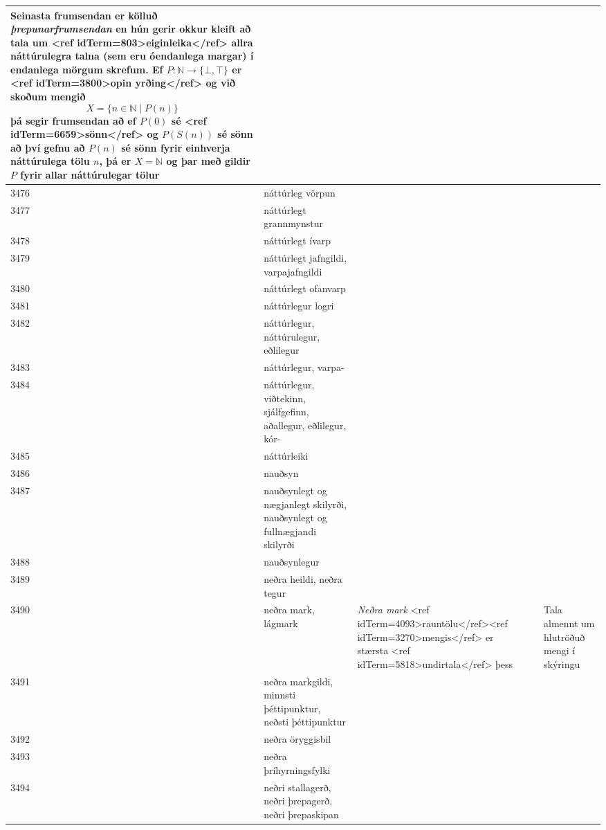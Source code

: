 \begin{longtable}{p{}|p{}|p{}|p{}|p{}}
Seinasta frumsendan er kölluð \textit{þrepunarfrumsendan} en hún gerir okkur kleift að tala um <ref idTerm=803>eiginleika</ref> allra náttúrulegra talna (sem eru óendanlega margar) í endanlega mörgum skrefum. Ef $P : \mathbb{N} \to \{\bot,\top\}$ er <ref idTerm=3800>opin yrðing</ref> og við skoðum mengið \[ X = \{ n \in \mathbb{N} \mid P(n)\} \] þá segir frumsendan að ef $P(0)$ sé <ref idTerm=6659>sönn</ref> og $P(S(n))$ sé sönn að því gefnu að $P(n)$ sé sönn fyrir einhverja náttúrulega tölu $n$, þá er $X = \mathbb{N}$ og þar með gildir $P$ fyrir allar náttúrulegar tölur
& \\
\hline
3476 & náttúrleg vörpun &  &  &  \\
\hline
3477 & náttúrlegt grannmynstur &  &  &  \\
\hline
3478 & náttúrlegt ívarp &  &  &  \\
\hline
3479 & náttúrlegt jafngildi, varpajafngildi &  &  &  \\
\hline
3480 & náttúrlegt ofanvarp &  &  &  \\
\hline
3481 & náttúrlegur logri &  &  &  \\
\hline
3482 & náttúrlegur, náttúrulegur, eðlilegur &  &  &  \\
\hline
3483 & náttúrlegur, varpa- &  &  &  \\
\hline
3484 & náttúrlegur, viðtekinn, sjálfgefinn, aðallegur, eðlilegur, kór- &  &  &  \\
\hline
3485 & náttúrleiki &  &  &  \\
\hline
3486 & nauðsyn &  &  &  \\
\hline
3487 & nauðsynlegt og nægjanlegt skilyrði, nauðsynlegt og fullnægjandi skilyrði &  &  &  \\
\hline
3488 & nauðsynlegur &  &  &  \\
\hline
3489 & neðra heildi, neðra tegur &  &  &  \\
\hline
3490 & neðra mark, lágmark & \textit{Neðra mark} <ref idTerm=4093>rauntölu</ref><ref idTerm=3270>mengis</ref> er stærsta <ref idTerm=5818>undirtala</ref> þess &  & Tala almennt um hlutröðuð mengi í skýringu \\
\hline
3491 & neðra markgildi, minnsti þéttipunktur, neðsti þéttipunktur &  &  &  \\
\hline
3492 & neðra öryggisbil &  &  &  \\
\hline
3493 & neðra þríhyrningsfylki &  &  &  \\
\hline
3494 & neðri stallagerð, neðri þrepagerð, neðri þrepaskipan &  &  &  \\

\end{longtable}
